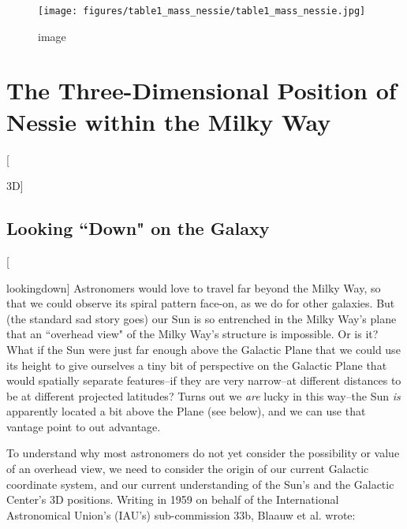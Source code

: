 \documentclass[]{article}
\begin{document}
\begin{figure}[htbp]
\centering
\texttt{[image: figures/table1\_mass\_nessie/table1\_mass\_nessie.jpg]}
\caption{image}
\end{figure}

\section{The Three-Dimensional Position of Nessie within the Milky Way}

{[}

3D{]}

\subsection{Looking ``Down" on the Galaxy}

{[}

lookingdown{]} Astronomers would love to travel far beyond the Milky
Way, so that we could observe its spiral pattern face-on, as we do for
other galaxies. But (the standard sad story goes) our Sun is so
entrenched in the Milky Way's plane that an ``overhead view" of the
Milky Way's structure is impossible. Or is it? What if the Sun were just
far enough above the Galactic Plane that we could use its height to give
ourselves a tiny bit of perspective on the Galactic Plane that would
spatially separate features--if they are very narrow--at different
distances to be at different projected latitudes? Turns out we
\emph{are} lucky in this way--the Sun \emph{is} apparently located a bit
above the Plane (see below), and we can use that vantage point to out
advantage.

To understand why most astronomers do not yet consider the possibility
or value of an overhead view, we need to consider the origin of our
current Galactic coordinate system, and our current understanding of the
Sun's and the Galactic Center's 3D positions. Writing in 1959 on behalf
of the International Astronomical Union's (IAU's) sub-commission 33b,
Blaauw et al. wrote:
\end{document}
